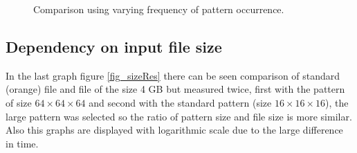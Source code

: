 \begin{figure}
\begin{minipage}{.5\linewidth}
\centering
{}
\end{minipage}%
\begin{minipage}{.5\linewidth}
\centering
{}
\end{minipage}\par\medskip

\caption{Comparison using varying frequency of pattern occurrence.}
\label{fig_patRes}
\end{figure}

\subsection{Dependency on input file size}
In the last graph figure \ref{fig_sizeRes} there can be seen comparison of standard (orange) file and file of the size 4 GB but measured twice, first with the pattern of size $64\times64\times64$ and second with the standard pattern (size $16\times16\times16$), the large pattern was selected so the ratio of pattern size and file size is more similar. Also this graphs are displayed with logarithmic scale due to the large difference in time. 

